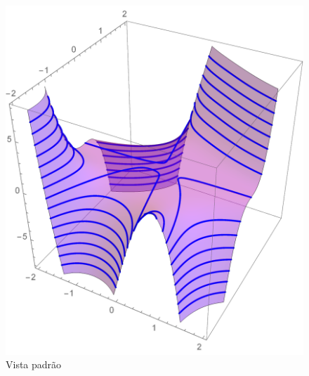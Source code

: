 \documentclass[a4paper, 12pt, brazilian]{article}
\begin{document}
	\begin{figure}[H]
		\centering
		\includegraphics[width=0.6\linewidth]{images/g153d2}
		\caption{Vista padrão}
	\end{figure}
	
	
	
	
	
\end{document}
